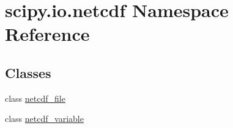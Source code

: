 \hypertarget{namespacescipy_1_1io_1_1netcdf}{}\section{scipy.\+io.\+netcdf Namespace Reference}
\label{namespacescipy_1_1io_1_1netcdf}
\subsection*{Classes}
\begin{DoxyCompactItemize}
\item 
class \hyperlink{classscipy_1_1io_1_1netcdf_1_1netcdf__file}{netcdf\+\_\+file}
\item 
class \hyperlink{classscipy_1_1io_1_1netcdf_1_1netcdf__variable}{netcdf\+\_\+variable}
\end{DoxyCompactItemize}
